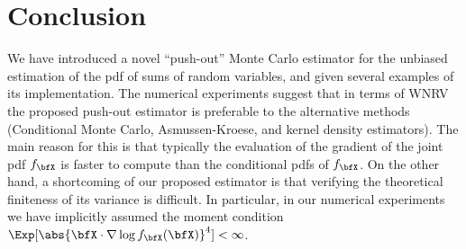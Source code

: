 \section{Conclusion} \label{sec:Conclusion}
We have introduced a novel ``push-out'' Monte Carlo estimator for the unbiased estimation of the pdf of sums of random variables, and given several examples of its implementation.  The numerical experiments suggest that in terms of WNRV the proposed push-out estimator is preferable to the alternative methods (Conditional Monte Carlo, Asmussen-Kroese, and kernel density estimators). The main reason for this is that typically the evaluation of the gradient of the joint pdf
$f_{\bfX}$ is faster to compute than the conditional pdfs of $f_{\bfX}$.
On the other hand, a shortcoming of our proposed estimator is that verifying the theoretical finiteness of its variance is difficult. In particular, in our numerical experiments we have implicitly assumed the moment condition $\Exp [ \abs{ \bfX \cdot \nabla \log f_{\bfX}(\bfX) }^4 ] <\infty$.


% 
% 


